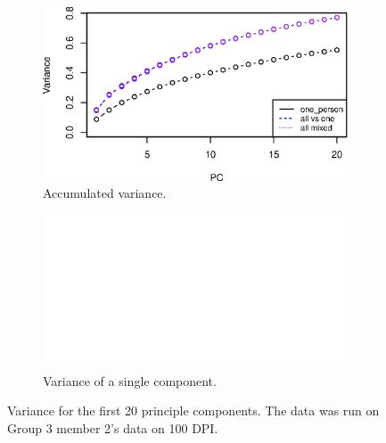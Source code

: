 \begin{figure}[H]
\centering
\begin{subfigure}{0.49\textwidth}
\centering
\includegraphics[width=\textwidth]{graphics/pca_acc_variance}
\caption{Accumulated variance.}
\label{fig:pca_accumulated_var}
\end{subfigure}
\centering
\begin{subfigure}{0.49\textwidth}
\centering
\includegraphics[width=\textwidth]{graphics/pca_variance}
\caption{Variance of a single component.}
\label{fig:pca_var}
\end{subfigure}
\caption[PCA variance.]{Variance for the first 20 principle components.
The data was run on Group 3 member 2's data on 100 DPI. }
\label{fig:variance}
\end{figure}


